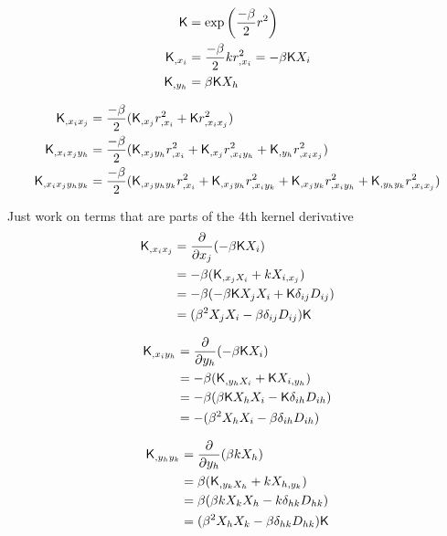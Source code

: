 \begin{align}
\mathsf{K} &= \exp{\left(\frac{-\beta}{2} r^2 \right)}\\
\mathsf{K}_{,x_i} &= \frac{-\beta}{2} k r^2_{,x_i} = -\beta \mathsf{K} X_i\\ 
\mathsf{K}_{,y_h} &= \beta \mathsf{K} X_h 
\end{align}

\begin{align}
\mathsf{K}_{,x_i x_j} &= \frac{-\beta}{2}(\mathsf{K}_{,x_j} r^2_{,x_i} + 
\mathsf{K} r^2_{,x_i x_j})\\
\mathsf{K}_{,x_i x_j y_h} &= \frac{-\beta}{2}(\mathsf{K}_{,x_j y_h} r^2_{,x_i} + \mathsf{K}_{,x_j}
r^2_{,x_i y_h} + \mathsf{K}_{,y_h} r^2_{,x_i x_j})\\
\mathsf{K}_{,x_i x_j y_h y_k} &= \frac{-\beta}{2} 
(\mathsf{K}_{,x_j y_h y_k} r^2_{,x_i} +
\mathsf{K}_{,x_j y_h} r^2_{,x_i y_k} + 
\mathsf{K}_{,x_j y_k} r^2_{,x_i y_h} + 
\mathsf{K}_{,y_h y_k} r^2_{,x_i x_j} )
\end{align}

Just work on terms that are parts of the 4th kernel derivative 
\begin{align*}
\mathsf{K}_{,x_i x_j} &= \frac{\partial}{\partial x_j} (-\beta \mathsf{K} X_i)\\
&= -\beta(\mathsf{K}_{,x_j X_i} + k X_{i, x_j})\\ 
&= -\beta(-\beta \mathsf{K} X_j X_i + \mathsf{K} \delta_{ij} D_{ij}) \\ 
&= (\beta^2 X_j X_i - \beta \delta_{ij} D_{ij})\mathsf{K} 
\end{align*}

\begin{align*}
\mathsf{K}_{,x_i y_h} &= \frac{\partial}{\partial y_h} (-\beta \mathsf{K} X_i)\\
&= -\beta(\mathsf{K}_{,y_h X_i} + \mathsf{K} X_{i, y_h})\\ 
&= -\beta(\beta \mathsf{K} X_h X_i - \mathsf{K} \delta_{ih} D_{ih}) \\ 
&= -(\beta^2 X_h X_i - \beta \delta_{ih} D_{ih})  
\end{align*}

\begin{align*}
\mathsf{K}_{,y_h y_k} &= \frac{\partial}{\partial y_h} (\beta k X_h)\\
&= \beta(\mathsf{K}_{,y_k X_h} + k X_{h, y_k})\\ 
&= \beta(\beta k X_k X_h - k \delta_{hk} D_{hk}) \\ 
&= (\beta^2 X_h X_k - \beta \delta_{hk} D_{hk})\mathsf{K} 
\end{align*}

